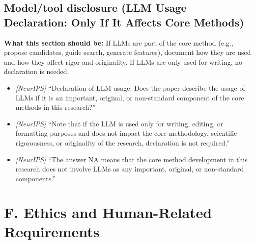 \documentclass[11pt]{article}
\begin{document}
\subsection{Model/tool disclosure (LLM Usage Declaration: Only If It Affects Core Methods)}
\noindent\textbf{What this section should be:}
If LLMs are part of the core method (e.g., propose candidates, guide search, generate features), document how they are used and how they affect rigor and originality. If LLMs are only used for writing, no declaration is needed.
\begin{itemize}
  \item \textit{[NeurIPS]} ``Declaration of LLM usage: Does the paper describe the usage of LLMs if it is an important, original, or non-standard component of the core methods in this research?''
  \item \textit{[NeurIPS]} ``Note that if the LLM is used only for writing, editing, or formatting purposes and does not impact the core methodology, scientific rigorousness, or originality of the research, declaration is not required.''
  \item \textit{[NeurIPS]} ``The answer NA means that the core method development in this research does not involve LLMs as any important, original, or non-standard components.''
\end{itemize}

\section*{F. Ethics and Human-Related Requirements}
\end{document}
